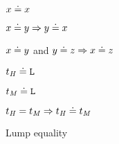 \begin{figure}[p]
\onehalfspacing
\centering

$x \doteq x$

$x \doteq y \Rightarrow y \doteq x$

$x \doteq y$ and $y \doteq z \Rightarrow x \doteq z$

$t_{\mathit{H}} \doteq \mathtt{L}$

$t_{\mathit{M}} \doteq \mathtt{L}$

$t_{\mathit{H}} = t_{\mathit{M}} \Rightarrow t_{\mathit{H}} \doteq t_{\mathit{M}}$

\caption{Lump equality}
\label{figequality}
\end{figure}

